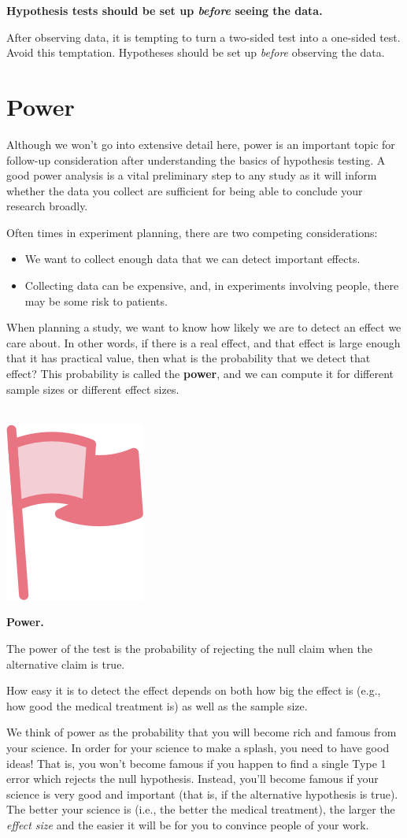\documentclass[
  10pt,
  openany]{book}
\providecommand{\tightlist}{%
  \setlength{\itemsep}{0pt}\setlength{\parskip}{0pt}}
\newenvironment{mdframedwithfootImportant}
{   
    \savenotes
    \begin{mdframed}[%
    topline=true, bottomline=true, linecolor=oiR, linewidth=0.5pt,
    rightline=false, leftline=false,
    backgroundcolor=oiLGray]
    \renewcommand{\thempfootnote}{\arabic{footnote}}
    }
{
    \end{mdframed}
    \spewnotes
}
\newenvironment{important}{
    \let\oldtextbf\textbf
    \renewcommand{\textbf}[1]{{\textcolor{oiR}{\oldtextbf{##1}}}}
\vspace{4mm}
\begin{mdframedwithfootImportant}
\begin{minipage}[t]{0.10\textwidth}
{$\:$ \\ \setkeys{Gin}{width=2.5em,keepaspectratio}\includegraphics{images/_icons/important.png}}
\end{minipage}
\hfill
\begin{minipage}[t]{0.90\textwidth}
\vspace{-2mm}
\setlength{\parskip}{1em}
}{\end{minipage}
\end{mdframedwithfootImportant}
\vspace{4mm}
}
\begin{document}
\textbf{Hypothesis tests should be set up \emph{before} seeing the data.}

After observing data, it is tempting to turn a two-sided test into a one-sided test.
Avoid this temptation.
Hypotheses should be set up \emph{before} observing the data.


\clearpage

\hypertarget{pow}{%
\section{Power}\label{pow}}

Although we won't go into extensive detail here, power is an important topic for follow-up consideration after understanding the basics of hypothesis testing.
A good power analysis is a vital preliminary step to any study as it will inform whether the data you collect are sufficient for being able to conclude your research broadly.

Often times in experiment planning, there are two competing considerations:

\begin{itemize}
\tightlist
\item
  We want to collect enough data that we can detect important effects.
\item
  Collecting data can be expensive, and, in experiments involving people, there may be some risk to patients.
\end{itemize}

When planning a study, we want to know how likely we are to detect an effect we care about.
In other words, if there is a real effect, and that effect is large enough that it has practical value, then what is the probability that we detect that effect?
This probability is called the \textbf{power}, and we can compute it for different sample sizes or different effect sizes.

\begin{important}
\textbf{Power.}

The power of the test is the probability of rejecting the null claim when the alternative claim is true.

How easy it is to detect the effect depends on both how big the effect is (e.g., how good the medical treatment is) as well as the sample size.

\end{important}

We think of power as the probability that you will become rich and famous from your science.
In order for your science to make a splash, you need to have good ideas!
That is, you won't become famous if you happen to find a single Type 1 error which rejects the null hypothesis.
Instead, you'll become famous if your science is very good and important (that is, if the alternative hypothesis is true).
The better your science is (i.e., the better the medical treatment), the larger the \emph{effect size} and the easier it will be for you to convince people of your work.
\end{document}

